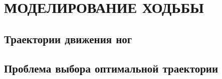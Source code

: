 \chapter{\MakeUppercase{Моделирование ходьбы}}
\section{Траектории движения ног}

\section{Проблема выбора оптимальной траектории}